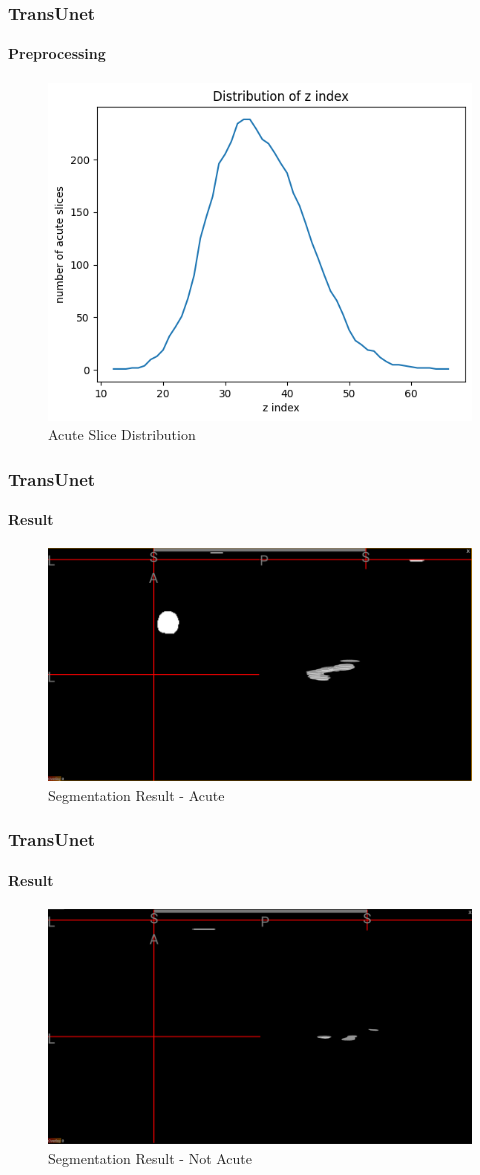 \documentclass[
	11pt, %
	aspectratio=169, %
]{beamer}
\begin{document}
\begin{frame}
	\frametitle{TransUnet}
	\framesubtitle{Preprocessing}

	\begin{figure}[H]
		\includegraphics[width = 0.5\linewidth]{acute.png}
		\caption{Acute Slice Distribution}
	\end{figure}
\end{frame}

\begin{frame}
	\frametitle{TransUnet}
	\framesubtitle{Result}

	\begin{figure}
		\includegraphics[width = 0.7\linewidth]{seg1.png}
		\caption{Segmentation Result - Acute}
	\end{figure}
\end{frame}

\begin{frame}
	\frametitle{TransUnet}
	\framesubtitle{Result}

	\begin{figure}
		\includegraphics[width = 0.7\linewidth]{seg2.png}
		\caption{Segmentation Result - Not Acute}
	\end{figure}
\end{frame}
\end{document}
